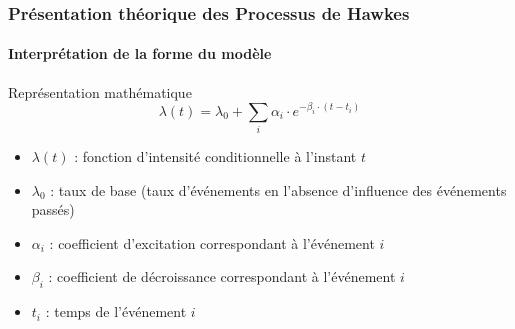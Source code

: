 \begin{frame}
    \frametitle{Présentation théorique des Processus de Hawkes}
    \framesubtitle{Interprétation de la forme du modèle}

    \begin{block}{Représentation mathématique}
        \[ \lambda(t) = \lambda_0 + \sum_i \alpha_i \cdot e^{-\beta_i \cdot (t - t_i)} \]

        \begin{itemize}
            \item $\lambda(t)$ : fonction d'intensité conditionnelle à l'instant $t$
            \item $\lambda_0$ : taux de base (taux d'événements en l'absence d'influence des événements passés)
            \item $\alpha_i$ : coefficient d'excitation correspondant à l'événement $i$
            \item $\beta_i$ : coefficient de décroissance correspondant à l'événement $i$
            \item $t_i$ : temps de l'événement $i$
        \end{itemize}
    \end{block}
\end{frame}


